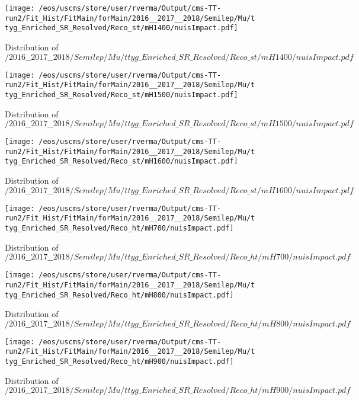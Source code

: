 \begin{figure}
\centering
\texttt{[image: /eos/uscms/store/user/rverma/Output/cms-TT-run2/Fit\_Hist/FitMain/forMain/2016\_\_2017\_\_2018/Semilep/Mu/ttyg\_Enriched\_SR\_Resolved/Reco\_st/mH1400/nuisImpact.pdf]}
\caption{Distribution of $/2016\_\_2017\_\_2018/Semilep/Mu/ttyg\_Enriched\_SR\_Resolved/Reco\_st/mH1400/nuisImpact.pdf$}
\end{figure}

\begin{figure}
\centering
\texttt{[image: /eos/uscms/store/user/rverma/Output/cms-TT-run2/Fit\_Hist/FitMain/forMain/2016\_\_2017\_\_2018/Semilep/Mu/ttyg\_Enriched\_SR\_Resolved/Reco\_st/mH1500/nuisImpact.pdf]}
\caption{Distribution of $/2016\_\_2017\_\_2018/Semilep/Mu/ttyg\_Enriched\_SR\_Resolved/Reco\_st/mH1500/nuisImpact.pdf$}
\end{figure}

\begin{figure}
\centering
\texttt{[image: /eos/uscms/store/user/rverma/Output/cms-TT-run2/Fit\_Hist/FitMain/forMain/2016\_\_2017\_\_2018/Semilep/Mu/ttyg\_Enriched\_SR\_Resolved/Reco\_st/mH1600/nuisImpact.pdf]}
\caption{Distribution of $/2016\_\_2017\_\_2018/Semilep/Mu/ttyg\_Enriched\_SR\_Resolved/Reco\_st/mH1600/nuisImpact.pdf$}
\end{figure}

\begin{figure}
\centering
\texttt{[image: /eos/uscms/store/user/rverma/Output/cms-TT-run2/Fit\_Hist/FitMain/forMain/2016\_\_2017\_\_2018/Semilep/Mu/ttyg\_Enriched\_SR\_Resolved/Reco\_ht/mH700/nuisImpact.pdf]}
\caption{Distribution of $/2016\_\_2017\_\_2018/Semilep/Mu/ttyg\_Enriched\_SR\_Resolved/Reco\_ht/mH700/nuisImpact.pdf$}
\end{figure}

\begin{figure}
\centering
\texttt{[image: /eos/uscms/store/user/rverma/Output/cms-TT-run2/Fit\_Hist/FitMain/forMain/2016\_\_2017\_\_2018/Semilep/Mu/ttyg\_Enriched\_SR\_Resolved/Reco\_ht/mH800/nuisImpact.pdf]}
\caption{Distribution of $/2016\_\_2017\_\_2018/Semilep/Mu/ttyg\_Enriched\_SR\_Resolved/Reco\_ht/mH800/nuisImpact.pdf$}
\end{figure}

\begin{figure}
\centering
\texttt{[image: /eos/uscms/store/user/rverma/Output/cms-TT-run2/Fit\_Hist/FitMain/forMain/2016\_\_2017\_\_2018/Semilep/Mu/ttyg\_Enriched\_SR\_Resolved/Reco\_ht/mH900/nuisImpact.pdf]}
\caption{Distribution of $/2016\_\_2017\_\_2018/Semilep/Mu/ttyg\_Enriched\_SR\_Resolved/Reco\_ht/mH900/nuisImpact.pdf$}
\end{figure}

